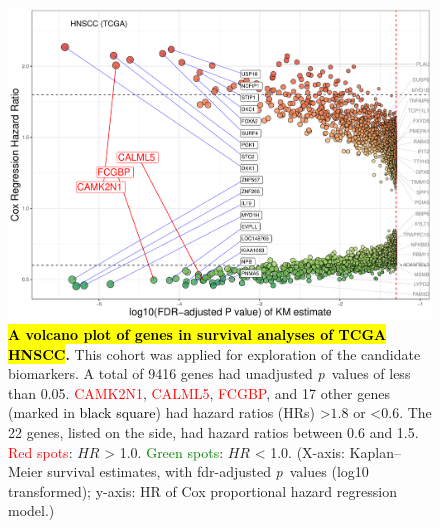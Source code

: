 \documentclass[
paper=landscape,
paper=160mm:90mm, %
fontsize=11pt, %
pagesize, %
parskip=half-, %
]{scrartcl} %
\newcommand{\bcaption}[2]{\caption{\textbf{#1} #2}}
\theoremstyle{mythmstyle} %
\begin{document}
\clearpage


\begin{figure}[H]
    \includegraphics[width=13cm]{Rplot_TCGA_HNSCC_CoxHR_CAMK2N1_top3FDRKM.pdf}
    \bcaption{\hl{A volcano plot of genes in survival analyses of TCGA HNSCC}.}{
    This cohort was applied for exploration of the candidate biomarkers.
    A total of 9416 genes had %
    unadjusted \textit{p}~values of less than 0.05.
    \textcolor{red}{CAMK2N1}, \textcolor{red}{CALML5}, \textcolor{red}{FCGBP}, and 17 other genes (marked in \textcolor{black}{black square}) had hazard ratios (HRs) >$1.8$ or <$0.6$.
    The 22 genes, listed on the side, had hazard ratios between 0.6 and 1.5.
    \textcolor{red}{Red spots}: $HR$ > 1.0.
    \textcolor{green}{Green spots}: $HR$ < 1.0.
    (X-axis: Kaplan--Meier survival estimates, with \acrshort{fdr}-adjusted \textit{p}~values (log10 transformed);
y-axis: HR of Cox proportional hazard regression model.)
    }
    \label{fig:hazards3}
\end{figure}
\end{document}
